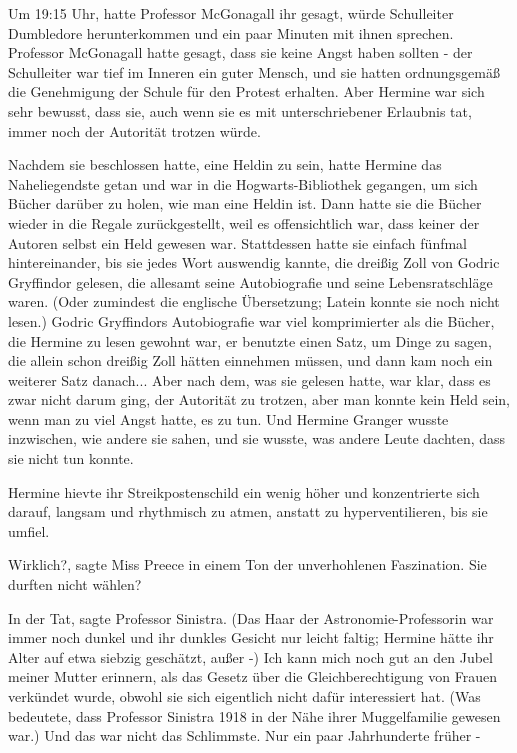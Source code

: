 Um 19:15 Uhr, hatte Professor McGonagall ihr gesagt, würde Schulleiter
Dumbledore herunterkommen und ein paar Minuten mit ihnen sprechen. Professor
McGonagall hatte gesagt, dass sie keine Angst haben sollten - der Schulleiter
war tief im Inneren ein guter Mensch, und sie hatten ordnungsgemäß die
Genehmigung der Schule für den Protest erhalten. Aber Hermine war sich sehr
bewusst, dass sie, auch wenn sie es mit unterschriebener Erlaubnis tat, immer
noch der Autorität trotzen würde.

Nachdem sie beschlossen hatte, eine Heldin zu sein, hatte Hermine das
Naheliegendste getan und war in die Hogwarts-Bibliothek gegangen, um sich Bücher
darüber zu holen, wie man eine Heldin ist. Dann hatte sie die Bücher wieder in
die Regale zurückgestellt, weil es offensichtlich war, dass keiner der Autoren
selbst ein Held gewesen war. Stattdessen hatte sie einfach fünfmal
hintereinander, bis sie jedes Wort auswendig kannte, die dreißig Zoll von Godric
Gryffindor gelesen, die allesamt seine Autobiografie und seine Lebensratschläge
waren. (Oder zumindest die englische Übersetzung; Latein konnte sie noch nicht
lesen.) Godric Gryffindors Autobiografie war viel komprimierter als die Bücher,
die Hermine zu lesen gewohnt war, er benutzte einen Satz, um Dinge zu sagen, die
allein schon dreißig Zoll hätten einnehmen müssen, und dann kam noch ein
weiterer Satz danach... Aber nach dem, was sie gelesen hatte, war klar, dass es
zwar nicht darum ging, der Autorität zu trotzen, aber man konnte kein Held sein,
wenn man zu viel Angst hatte, es zu tun. Und Hermine Granger wusste inzwischen,
wie andere sie sahen, und sie wusste, was andere Leute dachten, dass sie nicht
tun konnte.

Hermine hievte ihr Streikpostenschild ein wenig höher und konzentrierte sich
darauf, langsam und rhythmisch zu atmen, anstatt zu hyperventilieren, bis sie
umfiel.

\glqq Wirklich?\grqq{}, sagte Miss Preece in einem Ton der unverhohlenen
Faszination. \glqq Sie durften nicht wählen?\grqq{}

\glqq In der Tat\grqq{}, sagte Professor Sinistra. (Das Haar der
Astronomie-Professorin war immer noch dunkel und ihr dunkles Gesicht nur leicht
faltig; Hermine hätte ihr Alter auf etwa siebzig geschätzt, außer -) \glqq Ich
kann mich noch gut an den Jubel meiner Mutter erinnern, als das Gesetz über die
Gleichberechtigung von Frauen verkündet wurde, obwohl sie sich eigentlich nicht
dafür interessiert hat.\grqq{} (Was bedeutete, dass Professor Sinistra 1918 in
der Nähe ihrer Muggelfamilie gewesen war.) \glqq Und das war nicht das
Schlimmste. Nur ein paar Jahrhunderte früher -\grqq{}

